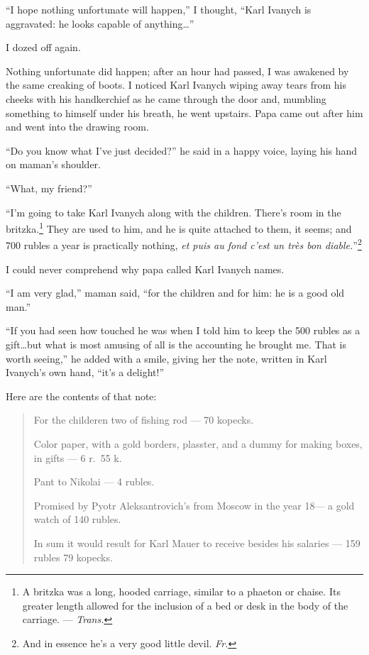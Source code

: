 ``I hope nothing unfortunate will happen,'' I thought, ``Karl Ivanych is aggravated: he looks capable of anything\ldots{}'' %

I dozed off again.

Nothing unfortunate did happen; after an hour had passed, I was awakened by the same creaking of boots. I noticed Karl Ivanych wiping away tears from his cheeks with his handkerchief as he came through the door and, mumbling something to himself under his breath, he went upstairs. Papa came out after him and went into the drawing room.

``Do you know what I've just decided?'' he said in a happy voice, laying his hand on maman's shoulder. %

``What, my friend?'' %

``I'm going to take Karl Ivanych along with the children. There's room in the britzka.\footnote{A britzka was a long, hooded carriage, similar to a phaeton or chaise. Its greater length allowed for the inclusion of a bed or desk in the body of the carriage. --- \textit{Trans.}} They are used to him, and he is quite attached to them, it seems; and 700 rubles a year is practically nothing, \textit{et puis au fond c'est un tr\`es bon diable.}''\footnote{And in essence he's a very good little devil. \textit{Fr.}} %

I could never comprehend why papa called Karl Ivanych names.

``I am very glad,'' maman said, ``for the children and for him: he is a good old man.'' %

``If you had seen how touched he was when I told him to keep the 500 rubles as a gift\ldots{}but what is most amusing of all is the accounting he brought me. That is worth seeing,'' he added with a smile, giving her the note, written in Karl Ivanych's own hand, ``it's a delight!'' %

Here are the contents of that note:

\begin{quotation}
For the childeren two of fishing rod --- 70 kopecks.

Color paper, with a gold borders, plasster, and a dummy for making boxes, in gifts --- 6 r.~55 k.

Pant to Nikolai --- 4 rubles.

Promised by Pyotr Aleksantrovich's from Moscow in the year 18--- a gold watch of 140 rubles.

In sum it would result for Karl Mauer to receive besides his salaries --- 159 rubles 79 kopecks. %
\end{quotation}

